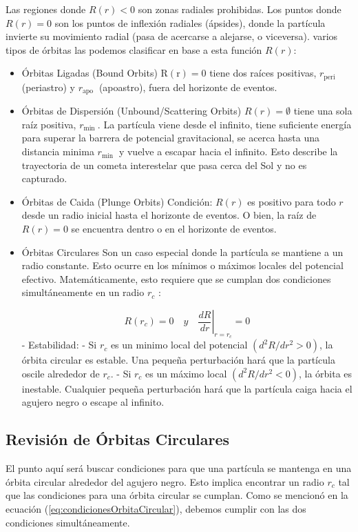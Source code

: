 Las regiones donde $R(r)<0$ son zonas radiales prohibidas. Los puntos donde $R(r)=0$ son los puntos de inflexión radiales (ápsides), donde la partícula invierte su movimiento radial (pasa de acercarse a alejarse, o viceversa).
varios tipos de órbitas las podemos clasificar en base a esta función $R(r)$:
\begin{itemize}
    \item Órbitas Ligadas (Bound Orbits)
          $\mathrm{R}(\mathrm{r})=0$ tiene dos raíces positivas, $r_{\text {peri }}$ (periastro) y $r_{\text {apo }}$ (apoastro), fuera del horizonte de eventos.
    \item Órbitas de Dispersión (Unbound/Scattering Orbits)
          $R(r)=\emptyset$ tiene una sola raíz positiva, $r_{\text {min }}$. La partícula viene desde el infinito, tiene suficiente energía para superar la barrera de potencial gravitacional, se acerca hasta una distancia minima $r_{\text {min }}$ y vuelve a escapar hacia el infinito. Esto describe la trayectoria de un cometa interestelar que pasa cerca del Sol y no es capturado.
    \item Órbitas de Caida (Plunge Orbits)
          Condición: $R(r)$ es positivo para todo $r$ desde un radio inicial hasta el horizonte de eventos. O bien, la raíz de $R(r)=0$ se encuentra dentro o en el horizonte de eventos.
    \item Órbitas Circulares
          Son un caso especial donde la partícula se mantiene a un radio constante. Esto ocurre en los mínimos o máximos locales del potencial efectivo. Matemáticamente, esto requiere que se cumplan dos condiciones simultáneamente en un radio $r_c$ :

          \begin{equation}
              R\left(r_c\right)=\left.0 \quad y \quad \frac{d R}{d r}\right|_{r=r_c}=0
              \label{eq:condicionesOrbitaCircular}
          \end{equation}
          - Estabilidad:
          - Si $r_c$ es un minimo local del potencial $\left(d^2 R / d r^2>0\right)$, la órbita circular es estable. Una pequeña perturbación hará que la partícula oscile alrededor de $r_c$.
          - Si $r_c$ es un máximo local $\left(d^2 R / d r^2<0\right)$, la órbita es inestable. Cualquier pequeña perturbación hará que la partícula caiga hacia el agujero negro o escape al infinito.
\end{itemize}
\subsection{Revisión de Órbitas Circulares}
El punto aquí será buscar condiciones para que una partícula se mantenga en una órbita circular alrededor del agujero negro. Esto implica encontrar un radio $r_c$ tal que las condiciones para una órbita circular se cumplan.
Como se mencionó en la ecuación (\ref{eq:condicionesOrbitaCircular}), debemos cumplir con las dos condiciones simultáneamente.



